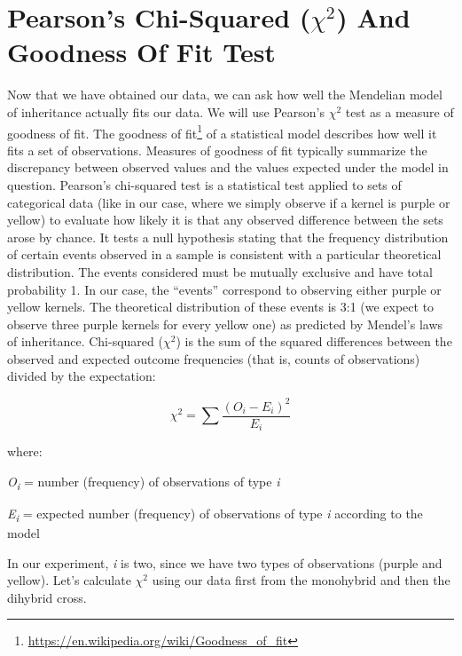 \documentclass[]{book}
\let\rmarkdownfootnote\footnote%
\def\footnote{\protect\rmarkdownfootnote}
\renewcommand{\href}[2]{#2\footnote{\url{#1}}}
\begin{document}
\hypertarget{pearsons-chi-squared-chi2-and-goodness-of-fit-test}{%
\section{\texorpdfstring{Pearson's Chi-Squared (\(\chi^2\)) And Goodness Of Fit Test}{Pearson's Chi-Squared (\textbackslash{}chi\^{}2) And Goodness Of Fit Test}}\label{pearsons-chi-squared-chi2-and-goodness-of-fit-test}}

Now that we have obtained our data, we can ask how well the Mendelian model of inheritance actually fits our data. We will use Pearson's \(\chi^2\) test as a measure of goodness of fit. The \href{https://en.wikipedia.org/wiki/Goodness_of_fit}{goodness of fit} of a statistical model describes how well it fits a set of observations. Measures of goodness of fit typically summarize the discrepancy between observed values and the values expected under the model in question. Pearson's chi-squared test is a statistical test applied to sets of categorical data (like in our case, where we simply observe if a kernel is purple or yellow) to evaluate how likely it is that any observed difference between the sets arose by chance. It tests a null hypothesis stating that the frequency distribution of certain events observed in a sample is consistent with a particular theoretical distribution. The events considered must be mutually exclusive and have total probability 1. In our case, the ``events'' correspond to observing either purple or yellow kernels. The theoretical distribution of these events is 3:1 (we expect to observe three purple kernels for every yellow one) as predicted by Mendel's laws of inheritance. Chi-squared (\(\chi^2\)) is the sum of the squared differences between the observed and expected outcome frequencies (that is, counts of observations) divided by the expectation:

\[ \chi^2=\sum\frac{(O_{i}-E_{i})^{2}}{E_{i}} \]

where:

\emph{O\textsubscript{i}} = number (frequency) of observations of type \emph{i}

\emph{E\textsubscript{i}} = expected number (frequency) of observations of type \emph{i} according to the model

In our experiment, \emph{i} is two, since we have two types of observations (purple and yellow). Let's calculate \(\chi^2\) using our data first from the monohybrid and then the dihybrid cross.
\end{document}
